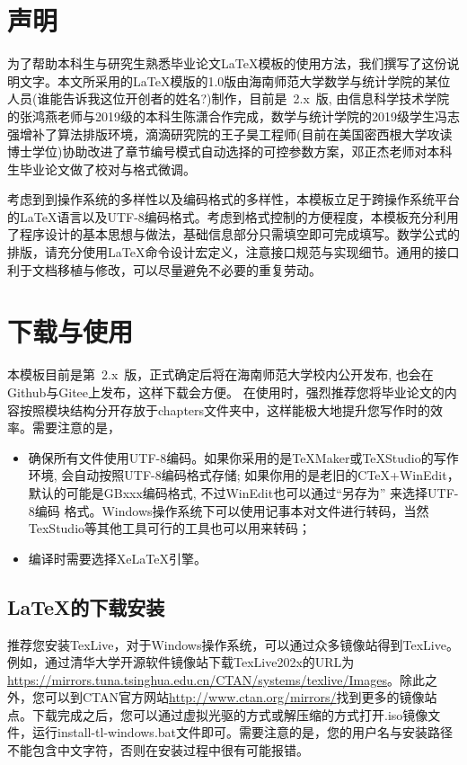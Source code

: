 \introduction

\section*{声明}
为了帮助本科生与研究生熟悉毕业论文{\LaTeX{}}模板的使用方法，我们撰写了这份说明文字。本文所采用的{\LaTeX{}}模版的1.0版由海南师范大学数学与统计学院的某位人员(谁能告诉我这位开创者的姓名?)制作，目前是~2.x~版, 由信息科学技术学院的张鸿燕老师与2019级的本科生陈潇合作完成，数学与统计学院的2019级学生冯志强增补了算法排版环境，滴滴研究院的王子昊工程师(目前在美国密西根大学攻读博士学位)协助改进了章节编号模式自动选择的可控参数方案，邓正杰老师对本科生毕业论文做了校对与格式微调。

考虑到到操作系统的多样性以及编码格式的多样性，本模板立足于跨操作系统平台的{\LaTeX{}}语言以及UTF-8编码格式。考虑到格式控制的方便程度，本模板充分利用了程序设计的基本思想与做法，基础信息部分只需填空即可完成填写。数学公式的排版，请充分使用{\LaTeX{}}命令设计宏定义，注意接口规范与实现细节。通用的接口利于文档移植与修改，可以尽量避免不必要的重复劳动。

\section*{下载与使用}

本模板目前是第~2.x~版，正式确定后将在海南师范大学校内公开发布, 也会在Github与Gitee上发布，这样下载会方便。
在使用时，强烈推荐您将毕业论文的内容按照模块结构分开存放于chapters文件夹中，这样能极大地提升您写作时的效率。需要注意的是，
\begin{itemize}
\item 确保所有文件使用UTF-8编码。如果你采用的是TeXMaker或TeXStudio的写作环境, 会自动按照UTF-8编码格式存储;
	如果你用的是老旧的CTeX+WinEdit，默认的可能是GBxxx编码格式, 不过WinEdit也可以通过“另存为” 来选择UTF-8编码
	格式。Windows操作系统下可以使用记事本对文件进行转码，当然TexStudio等其他工具可行的工具也可以用来转码；
\item 编译时需要选择XeLaTeX引擎。
\end{itemize}

\subsection*{\LaTeX{}的下载安装}
推荐您安装TexLive，对于Windows操作系统，可以通过众多镜像站得到TexLive。例如，通过清华大学开源软件镜像站下载TexLive202x的URL为\url{https://mirrors.tuna.tsinghua.edu.cn/CTAN/systems/texlive/Images}。除此之外，您可以到CTAN官方网站\url{http://www.ctan.org/mirrors/}找到更多的镜像站点。下载完成之后，您可以通过虚拟光驱的方式或解压缩的方式打开.iso镜像文件，运行install-tl-windows.bat文件即可。需要注意的是，您的用户名与安装路径不能包含中文字符，否则在安装过程中很有可能报错。

